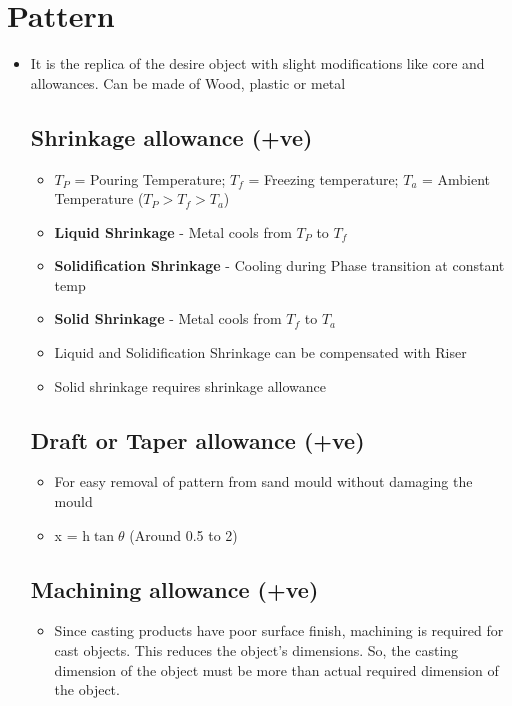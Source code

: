 \documentclass[8pt]{report}
\begin{document}
\section{Pattern}
	\begin{itemize}
		\item It is the replica of the desire object with slight modifications like core and allowances. Can be made of Wood, plastic or metal
		\subsection{Shrinkage allowance (+ve)}
			\begin{itemize}
				\item $T_P$ = Pouring Temperature; $T_f$ = Freezing temperature; $T_a$ = Ambient Temperature ($T_P > T_f > T_a$)
				\item \textbf{Liquid Shrinkage} - Metal cools from $T_P$ to $T_f$
				\item \textbf{Solidification Shrinkage} - Cooling during Phase transition at constant temp
				\item \textbf{Solid Shrinkage} - Metal cools from $T_f$ to $T_a$
				\item Liquid and Solidification Shrinkage can be compensated with Riser
				\item Solid shrinkage requires shrinkage allowance
			\end{itemize}\hrulefill
		\subsection{Draft or Taper allowance (+ve)}
			\begin{itemize}
				\item For easy removal of pattern from sand mould without damaging the mould
				\item x = h$\tan\theta$ (Around 0.5 to 2\textdegree)
			\end{itemize}\hrulefill
		\subsection{Machining allowance (+ve)}
			\begin{itemize}
				\item Since casting products have poor surface finish, machining is required for cast objects. This reduces the object's dimensions. So, the casting dimension of the object must be more than actual required dimension of the object. 
			\end{itemize}\hrulefill

\end{itemize}
\end{document}
